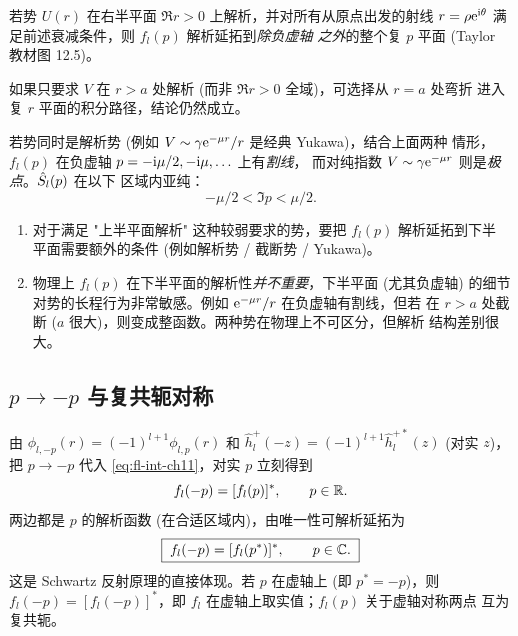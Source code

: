 \begin{theorem}
若势 $U(r)$ 在右半平面 $\Re r>0$ 上解析，并对所有从原点出发的射线
$r=\rho\mathrm{e}^{\mathrm{i}\theta}$ 满足前述衰减条件，则 $f_l(p)$ 解析延拓到\emph{除负虚轴
之外}的整个复 $p$ 平面 (Taylor 教材图 12.5)。
\end{theorem}

如果只要求 $V$ 在 $r>a$ 处解析 (而非 $\Re r>0$ 全域)，可选择从 $r=a$ 处弯折
进入复 $r$ 平面的积分路径，结论仍然成立。

\begin{remark}
若势同时是解析势 (例如 $V\sim\gamma\mathrm{e}^{-\mu r}/r$ 是经典 Yukawa)，结合上面两种
情形，$f_l(p)$ 在负虚轴 $p=-\mathrm{i}\mu/2,-\mathrm{i}\mu,\ldots$ 上有\emph{割线}，
而对纯指数 $V\sim\gamma\mathrm{e}^{-\mu r}$ 则是\emph{极点}。$\hat{S}_l(p)$ 在以下
区域内亚纯：
\begin{equation}
-\mu/2<\Im p<\mu/2.
\label{eq:Sl-meromorphic}
\end{equation}
\end{remark}

\begin{remark}[关于下半平面解析性的两点说明]\label{rem:two-remarks}
\begin{enumerate}
\item 对于满足 "上半平面解析" 这种较弱要求的势，要把 $f_l(p)$ 解析延拓到下半
平面需要额外的条件 (例如解析势 / 截断势 / Yukawa)。
\item 物理上 $f_l(p)$ 在下半平面的解析性\emph{并不重要}，下半平面 (尤其负虚轴)
的细节对势的长程行为非常敏感。例如 $\mathrm{e}^{-\mu r}/r$ 在负虚轴有割线，但若
在 $r>a$ 处截断 ($a$ 很大)，则变成整函数。两种势在物理上不可区分，但解析
结构差别很大。
\end{enumerate}
\end{remark}

\subsection{$p\to-p$ 与复共轭对称}\label{ssec:symmetries}

由 $\phi_{l,-p}(r)=(-1)^{l+1}\phi_{l,p}(r)$ 和 $\hat h^+_l(-z)=(-1)^{l+1}\hat h^{+*}_l(z)$
(对实 $z$)，把 $p\to-p$ 代入 \eqref{eq:fl-int-ch11}，对实 $p$ 立刻得到
\begin{equation}
f_l(-p) = [f_l(p)]^*,\qquad p\in\mathbb{R}.
\label{eq:fl-real-conj}
\end{equation}
两边都是 $p$ 的解析函数 (在合适区域内)，由唯一性可解析延拓为
\begin{equation}
\boxed{\;f_l(-p) = [f_l(p^*)]^*,\qquad p\in\mathbb{C}.\;}
\label{eq:fl-schwartz}
\end{equation}
这是 Schwartz 反射原理的直接体现。若 $p$ 在虚轴上 (即 $p^*=-p$)，则
$f_l(-p)=[f_l(-p)]^*$，即 $f_l$ 在虚轴上取实值；$f_l(p)$ 关于虚轴对称两点
互为复共轭。

